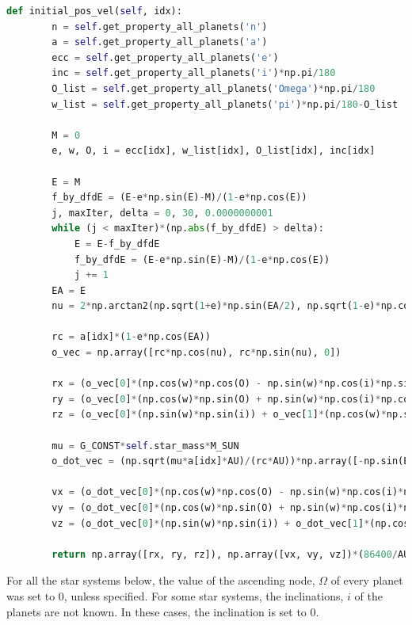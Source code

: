 \documentclass[11pt, oneside]{article}   	%
\begin{document}
\begin{lstlisting}[language=Python, caption={Calculating initial conditions for n-body simulation}]
	def initial_pos_vel(self, idx):
        n = self.get_property_all_planets('n')
        a = self.get_property_all_planets('a')
        ecc = self.get_property_all_planets('e')
        inc = self.get_property_all_planets('i')*np.pi/180
        O_list = self.get_property_all_planets('Omega')*np.pi/180
        w_list = self.get_property_all_planets('pi')*np.pi/180-O_list

        M = 0
        e, w, O, i = ecc[idx], w_list[idx], O_list[idx], inc[idx]

        E = M
        f_by_dfdE = (E-e*np.sin(E)-M)/(1-e*np.cos(E))
        j, maxIter, delta = 0, 30, 0.0000000001
        while (j < maxIter)*(np.abs(f_by_dfdE) > delta):
            E = E-f_by_dfdE
            f_by_dfdE = (E-e*np.sin(E)-M)/(1-e*np.cos(E))
            j += 1
        EA = E
        nu = 2*np.arctan2(np.sqrt(1+e)*np.sin(EA/2), np.sqrt(1-e)*np.cos(EA/2))

        rc = a[idx]*(1-e*np.cos(EA))
        o_vec = np.array([rc*np.cos(nu), rc*np.sin(nu), 0])

        rx = (o_vec[0]*(np.cos(w)*np.cos(O) - np.sin(w)*np.cos(i)*np.sin(O)) - o_vec[1]*(np.sin(w)*np.cos(O) + np.cos(w)*np.cos(i)*np.sin(O)))
        ry = (o_vec[0]*(np.cos(w)*np.sin(O) + np.sin(w)*np.cos(i)*np.cos(O)) + o_vec[1]*(np.cos(w)*np.cos(i)*np.cos(O) - np.sin(w)*np.sin(O)))
        rz = (o_vec[0]*(np.sin(w)*np.sin(i)) + o_vec[1]*(np.cos(w)*np.sin(i)))

        mu = G_CONST*self.star_mass*M_SUN
        o_dot_vec = (np.sqrt(mu*a[idx]*AU)/(rc*AU))*np.array([-np.sin(EA), np.sqrt(1-e**2)*np.cos(EA), 0])
        
        vx = (o_dot_vec[0]*(np.cos(w)*np.cos(O) - np.sin(w)*np.cos(i)*np.sin(O)) - o_dot_vec[1]*(np.sin(w)*np.cos(O) + np.cos(w)*np.cos(i)*np.sin(O)))
        vy = (o_dot_vec[0]*(np.cos(w)*np.sin(O) + np.sin(w)*np.cos(i)*np.cos(O)) + o_dot_vec[1]*(np.cos(w)*np.cos(i)*np.cos(O) - np.sin(w)*np.sin(O)))
        vz = (o_dot_vec[0]*(np.sin(w)*np.sin(i)) + o_dot_vec[1]*(np.cos(w)*np.sin(i)))

        return np.array([rx, ry, rz]), np.array([vx, vy, vz])*(86400/AU)
\end{lstlisting}

For all the star systems below, the value of the ascending node, $\Omega$ of every planet was set to 0, unless specified. For some star systems, the inclinations, $i$ of the planets are not known. In these cases, the inclination is set to 0.
\end{document}
